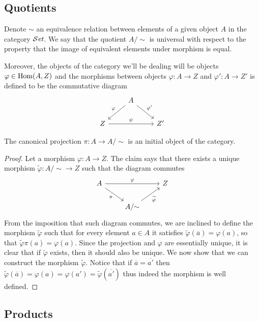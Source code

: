 \subsection{Quotients}

Denote \(\sim\) an equivalence relation between elements of a given object
\(A\) in the category \({\mathcal{S}\textit{et}}\). We say that the quotient \(A/{\sim}\) is
universal with respect to the property that the image of equivalent elements
under morphism is equal.

Moreover, the objects of the category we'll be dealing will be objects
\(\varphi \in \operatorname{Hom}(A, Z)\) and the morphisms between objects \(\varphi : A \to
Z\) and \(\varphi' : A \to Z'\) is defined to be the commutative diagram
\[
  \begin{tikzcd}
      &A \ar[dl, swap, "\varphi"] \ar[dr, "\varphi'"] & \\
    Z \ar[rr, "\psi"] & &Z'
  \end{tikzcd}
\]

\begin{proposition}
   The canonical projection \(\pi : A \to A/{\sim}\) is an initial object of the
   category.
\end{proposition}

\begin{proof}
   Let a morphism \(\varphi: A \to Z\). The claim says that there exists a
   unique morphism \(\tilde{\varphi} : A/{\sim} \to Z\) such that the diagram
   commutes
    \[
      \begin{tikzcd}
        A \ar[rr, "\varphi"] \ar[dr, swap, "\pi"]
          &
            & Z \\
          & A/{\sim} \ar[ur, swap, "\widetilde \varphi"]
      \end{tikzcd}
   \]
   From the imposition that such diagram commutes, we are inclined to define the
   morphism \(\tilde\varphi\) such that for every element \(a \in A\) it
   satisfies \(\tilde\varphi(\overline{a}) = \varphi(a)\), so that
   \(\tilde\varphi  \pi (a) = \varphi(a)\). Since the projection and
   \(\varphi\) are essentially unique, it is clear that if \(\tilde\varphi\)
   exists, then it should also be unique. We now show that we can construct the
   morphism \(\tilde\varphi\). Notice that if \(\overline{a} = \overline{a'}\)
   then \(\tilde\varphi(\overline{a}) = \varphi(a)= \varphi(a') =
   \tilde\varphi(\overline{a'})\) thus indeed the morphism is well defined.
\end{proof}

\subsection{Products}

